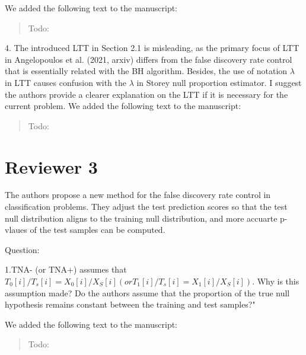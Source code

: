 \documentclass{article}
\newcommand{\response}[1]{\vspace*{1ex} \color{blue} \noindent #1 \color{black}
\vspace*{2ex}}
\newcommand{\edit}[1]{\begin{quotation}\color{red}\noindent #1
\color{black}\end{quotation}}
\begin{document}
\response{We added the following text to the manuscript:}

\edit{Todo:}

4. The introduced LTT in Section 2.1 is misleading, as the primary focus of LTT in Angelopoulos et al. (2021, arxiv) differs from the false discovery rate control that is essentially related with the BH algorithm.
Besides, the use of notation $\lambda$ in LTT causes confusion with the $\lambda$ in Storey null proportion estimator.
I suggest the authors provide a clearer explanation on the LTT if it is necessary for the current problem.
\response{We added the following text to the manuscript:}

\edit{Todo:}

\section*{Reviewer 3}

The authors propose a new method for the false discovery rate control in classification problems. They adjust the test prediction scores so that the test null distribution
aligns to the training null distribution, and more accuarte p-vlaues of the test samples can be computed.

Question:

1.TNA- (or TNA+) assumes that $T_0[i]/T_s[i]= X_0[i]/X_S[i] (or T_1[i]/T_s[i]= X_1[i]/X_S[i] )$. Why is this assumption made? Do the authors assume that the proportion of the true null hypothesis remains constant between the training and test samples?"

\response{We added the following text to the manuscript:}

\edit{Todo:}



\end{document}

